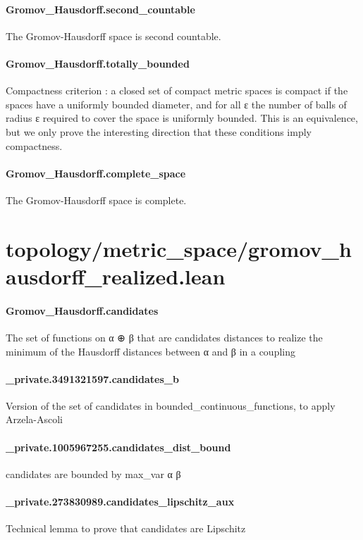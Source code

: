 \documentclass{article}
\begin{document}
\paragraph{Gromov\_Hausdorff.second\_countable}
\par
The Gromov-Hausdorff space is second countable.
\paragraph{Gromov\_Hausdorff.totally\_bounded}
\par
Compactness criterion : a closed set of compact metric spaces is compact if the spaces have
a uniformly bounded diameter, and for all ε the number of balls of radius ε required
to cover the space is uniformly bounded. This is an equivalence, but we only prove the
interesting direction that these conditions imply compactness.
\paragraph{Gromov\_Hausdorff.complete\_space}
\par
The Gromov-Hausdorff space is complete.
\section{topology/metric\_space/gromov\_hausdorff\_realized.lean}\paragraph{Gromov\_Hausdorff.candidates}
\par
The set of functions on α ⊕ β that are candidates distances to realize the
minimum of the Hausdorff distances between α and β in a coupling
\paragraph{\_private.3491321597.candidates\_b}
\par
Version of the set of candidates in bounded\_continuous\_functions, to apply
Arzela-Ascoli
\paragraph{\_private.1005967255.candidates\_dist\_bound}
\par
candidates are bounded by max\_var α β
\paragraph{\_private.273830989.candidates\_lipschitz\_aux}
\par
Technical lemma to prove that candidates are Lipschitz
\end{document}
